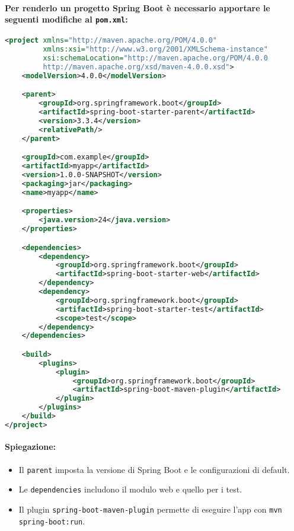 \paragraph{Per renderlo un progetto Spring Boot è necessario apportare le seguenti modifiche al \texttt{pom.xml}:}

\begin{lstlisting}[language=xml, caption={Esempio di pom.xml per Spring Boot}]
<project xmlns="http://maven.apache.org/POM/4.0.0"
         xmlns:xsi="http://www.w3.org/2001/XMLSchema-instance"
         xsi:schemaLocation="http://maven.apache.org/POM/4.0.0
         http://maven.apache.org/xsd/maven-4.0.0.xsd">
    <modelVersion>4.0.0</modelVersion>

    <parent>
        <groupId>org.springframework.boot</groupId>
        <artifactId>spring-boot-starter-parent</artifactId>
        <version>3.3.4</version>
        <relativePath/>
    </parent>

    <groupId>com.example</groupId>
    <artifactId>myapp</artifactId>
    <version>1.0.0-SNAPSHOT</version>
    <packaging>jar</packaging>
    <name>myapp</name>

    <properties>
        <java.version>24</java.version>
    </properties>

    <dependencies>
        <dependency>
            <groupId>org.springframework.boot</groupId>
            <artifactId>spring-boot-starter-web</artifactId>
        </dependency>
        <dependency>
            <groupId>org.springframework.boot</groupId>
            <artifactId>spring-boot-starter-test</artifactId>
            <scope>test</scope>
        </dependency>
    </dependencies>

    <build>
        <plugins>
            <plugin>
                <groupId>org.springframework.boot</groupId>
                <artifactId>spring-boot-maven-plugin</artifactId>
            </plugin>
        </plugins>
    </build>
</project>
\end{lstlisting}
\paragraph{Spiegazione:}
\begin{itemize}
  \item Il \texttt{parent} imposta la versione di Spring Boot e le configurazioni di default.
  \item Le \texttt{dependencies} includono il modulo web e quello per i test.
  \item Il plugin \texttt{spring-boot-maven-plugin} permette di eseguire l'app con \texttt{mvn spring-boot:run}.
\end{itemize}
